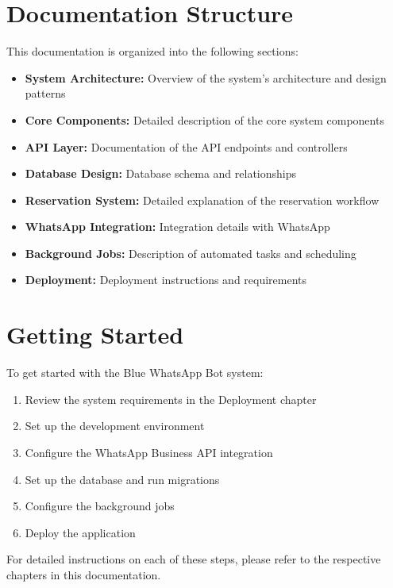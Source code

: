 \section{Documentation Structure}
This documentation is organized into the following sections:

\begin{itemize}
    \item \textbf{System Architecture:} Overview of the system's architecture and design patterns
    \item \textbf{Core Components:} Detailed description of the core system components
    \item \textbf{API Layer:} Documentation of the API endpoints and controllers
    \item \textbf{Database Design:} Database schema and relationships
    \item \textbf{Reservation System:} Detailed explanation of the reservation workflow
    \item \textbf{WhatsApp Integration:} Integration details with WhatsApp
    \item \textbf{Background Jobs:} Description of automated tasks and scheduling
    \item \textbf{Deployment:} Deployment instructions and requirements
\end{itemize}

\section{Getting Started}
To get started with the Blue WhatsApp Bot system:

\begin{enumerate}
    \item Review the system requirements in the Deployment chapter
    \item Set up the development environment
    \item Configure the WhatsApp Business API integration
    \item Set up the database and run migrations
    \item Configure the background jobs
    \item Deploy the application
\end{enumerate}

For detailed instructions on each of these steps, please refer to the respective chapters in this documentation. 